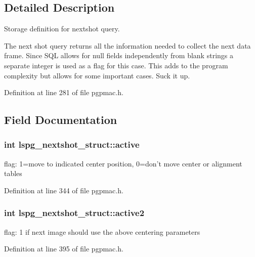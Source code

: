 \subsection{Detailed Description}
Storage definition for nextshot query. 

The next shot query returns all the information needed to collect the next data frame. Since S\-Q\-L allows for null fields independently from blank strings a separate integer is used as a flag for this case. This adds to the program complexity but allows for some important cases. Suck it up. 

Definition at line 281 of file pgpmac.\-h.



\subsection{Field Documentation}
\hypertarget{structlspg__nextshot__struct_a1a94eefbad713976a3d9213695a6ca28}{
\subsubsection[{active}]{\setlength{\rightskip}{0pt plus 5cm}int lspg\-\_\-nextshot\-\_\-struct\-::active}}\label{structlspg__nextshot__struct_a1a94eefbad713976a3d9213695a6ca28}


flag\-: 1=move to indicated center position, 0=don't move center or alignment tables 



Definition at line 344 of file pgpmac.\-h.

\hypertarget{structlspg__nextshot__struct_a2875aa18df587806a3d8c05220fd62b5}{
\subsubsection[{active2}]{\setlength{\rightskip}{0pt plus 5cm}int lspg\-\_\-nextshot\-\_\-struct\-::active2}}\label{structlspg__nextshot__struct_a2875aa18df587806a3d8c05220fd62b5}


flag\-: 1 if next image should use the above centering parameters 



Definition at line 395 of file pgpmac.\-h.

